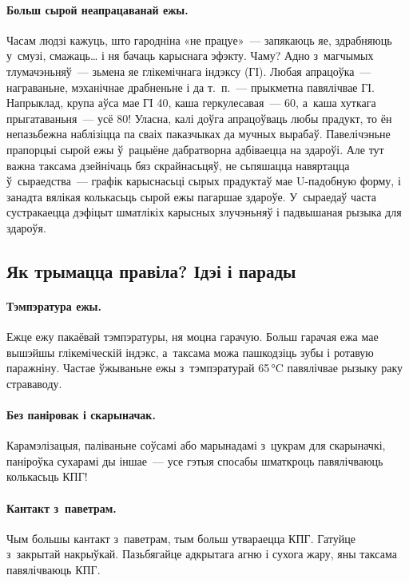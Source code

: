 \paragraph{Больш сырой неапрацаванай ежы.}
Часам людзі кажуць, што гародніна «не працуе»~--- запякаюць яе, здрабняюць у~смузі, смажаць… і ня бачаць карыснага эфэкту. Чаму? Адно з~магчымых тлумачэньняў~--- зьмена яе глікемічнага індэксу (ГІ). Любая апрацоўка~--- награваньне, мэханічнае драбненьне і да т.~п.~--- прыкметна павялічвае ГІ. Напрыклад, крупа аўса мае ГІ 40, каша геркулесавая~--- 60, а~каша хуткага прыгатаваньня~--- усё 80! Уласна, калі доўга апрацоўваць любы прадукт, то ён непазьбежна наблізіцца па сваіх паказчыках да мучных вырабаў. Павелічэньне прапорцыі сырой ежы ў~рацыёне дабратворна адбіваецца на здароўі. Але тут важна таксама дзейнічаць бяз скрайнасьцяў, не сьпяшацца навяртацца ў~сыраедства~--- графік карыснасьці сырых прадуктаў мае U-падобную форму, і занадта вялікая колькасьць сырой ежы пагаршае здароўе. У~сыраедаў часта сустракаецца дэфіцыт шматлікіх карысных злучэньняў і падвышаная рызыка для здароўя.

\subsection{Як трымацца правіла? Ідэі і парады}

\paragraph{Тэмпэратура ежы.}
Ежце ежу пакаёвай тэмпэратуры, ня моцна гарачую. Больш гарачая ежа мае вышэйшы глікеміческій індэкс, а~таксама можа пашкодзіць зубы і ротавую паражніну. Частае ўжываньне ежы з~тэмпэратурай 65\,°C павялічвае рызыку раку страваводу.

\paragraph{Без паніровак і скарыначак.}
Карамэлізацыя, паліваньне соўсамі або марынадамі з~цукрам для скарыначкі, паніроўка сухарамі ды іншае~--- усе гэтыя спосабы шматкроць павялічваюць колькасьць КПГ!

\paragraph{Кантакт з~паветрам.}
Чым большы кантакт з~паветрам, тым больш утвараецца КПГ. Гатуйце з~закрытай накрыўкай. Пазьбягайце адкрытага агню і сухога жару, яны таксама павялічваюць КПГ.

